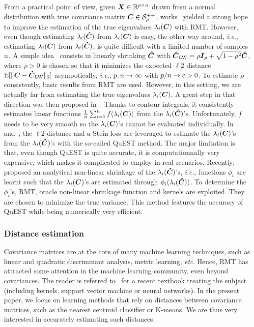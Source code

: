 \documentclass{article}
\theoremstyle{plain}
\theoremstyle{definition}
\theoremstyle{remark}
\begin{document}
From a practical point of view, given $\boldsymbol{X}\in\mathbb{R}^{p\times n}$ drawn from a normal distribution with true covariance matrix $\boldsymbol{C}\in\mathcal{S}^{++}_{p}$,  works~\cite{silverstein1995empirical,bai1998no} yielded a strong hope to improve the estimation of the true eigenvalues $\lambda_i(\boldsymbol{C})$  with RMT.
However, even though estimating $\lambda_i(\boldsymbol{\hat{C}})$ from $\lambda_i(\boldsymbol{C})$ is easy, the other way around, \emph{i.e.}, estimating $\lambda_i(\boldsymbol{C})$ from $\lambda_i(\boldsymbol{\hat{C}})$, is quite difficult with a limited number of samples $n$.
%
A simple idea~\cite{ledoit2004well} consists in linearly shrinking $\boldsymbol{\hat{C}}$ with $\boldsymbol{\hat{C}}_{\textup{LW}}=\rho\boldsymbol{I}_{p} + \sqrt{1-\rho^2}\boldsymbol{\hat{C}}$, where $\rho>0$ is chosen so that it minimizes the expected $\ell2$ distance $\mathbb{E}[\| \boldsymbol{C} - \boldsymbol{\hat{C}}_{\textup{LW}} \|_2]$ asympotically, \emph{i.e.}, $p,n\to\infty$ with $p/n\to c>0$.
To estimate $\rho$ consistently, basic results from RMT are used.
However, in this setting, we are actually far from estimating the true eigenvalues $\lambda_i(\boldsymbol{C})$.
%
A great step in that direction was then proposed in~\cite{mestre2008asymptotic}.
Thanks to contour integrals, it consistently estimates linear functions $\frac1{n}\sum_{i=1}^{n} f(\lambda_i(\boldsymbol{C}))$ from the $\lambda_i(\boldsymbol{\hat{C}})$'s.
Unfortunately, $f$ needs to be very smooth so the $\lambda_i(\boldsymbol{C})$'s cannot be evaluated individually.
%
In~\cite{ledoit2015spectrum} and~\cite{ledoit2018optimal}, the $\ell2$ distance and a Stein loss are leveraged to estimate the $\lambda_i(\boldsymbol{C})$'s from the $\lambda_i(\boldsymbol{\hat{C}})$'s with the so-called QuEST method.
The major limitation is that, even though QuEST is quite accurate, it is computationnally very expensive, which makes it complicated to employ in real scenarios.
%
Recently, \cite{ledoit2020analytical} proposed an analytical non-linear shrinkage of the $\lambda_i(\boldsymbol{\hat{C}})$'s, \emph{i.e.}, functions $\phi_i$ are learnt such that the $\lambda_i(\boldsymbol{C})$'s are estimated through $\phi_i(\lambda_i(\boldsymbol{\hat{C}}))$.
To determine the $\phi_i$'s, RMT, oracle non-linear shrinkage function and kernels are exploited.
They are chosen to minimize the true variance.
This method features the accuracy of QuEST while being numerically very efficient.

\subsubsection{Distance estimation}
\label{sec:preliminaries:RMT_dist}
Covariance matrices are at the core of many machine learning techniques, such as linear and quadratic discriminant analysis, metric learning, \emph{etc}.
Hence, RMT has attracted some attention in the machine learning community, even beyond covariances.
The reader is referred to~\cite{couillet2022random} for a recent textbook treating the subject (including kernels, support vector machine  or neural networks).
In the present paper, we focus on learning methods that rely on distances between covariance matrices, such as the nearest centroid classifier or K-means.
We are thus very interested in accurately estimating such distances.
\end{document}
